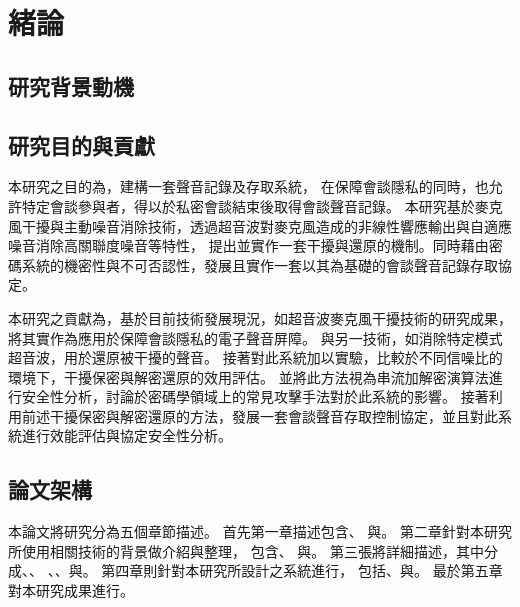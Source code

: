 \chapter{緒論}\label{chapter:intro}

\section{研究背景動機}\label{section:intro-background}


\section{研究目的與貢獻}\label{section:intro-purpose}

    本研究之目的為，建構一套聲音記錄及存取系統，
在保障會談隱私的同時，也允許特定會談參與者，得以於私密會談結束後取得會談聲音記錄。
本研究基於麥克風干擾與主動噪音消除技術，透過超音波對麥克風造成的非線性響應輸出與自適應噪音消除高關聯度噪音等特性，
提出並實作一套干擾與還原的機制。同時藉由密碼系統的機密性與不可否認性，發展且實作一套以其為基礎的會談聲音記錄存取協定。

本研究之貢獻為，基於目前技術發展現況，如超音波麥克風干擾技術的研究成果，將其實作為應用於保障會談隱私的電子聲音屏障。
與另一技術，如消除特定模式超音波，用於還原被干擾的聲音。
接著對此系統加以實驗，比較於不同信噪比的環境下，干擾保密與解密還原的效用評估。
並將此方法視為串流加解密演算法進行安全性分析，討論於密碼學領域上的常見攻擊手法對於此系統的影響。
接著利用前述干擾保密與解密還原的方法，發展一套會談聲音存取控制協定，並且對此系統進行效能評估與協定安全性分析。


\section{論文架構}\label{section:intro-arch}

    本論文將研究分為五個章節描述。
首先第一章描述包含、
與。
第二章針對本研究所使用相關技術的背景做介紹與整理，
包含、
與。
第三張將詳細描述，其中分成、、
、、與。
第四章則針對本研究所設計之系統進行，
包括、與。
最於第五章對本研究成果進行。